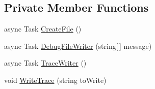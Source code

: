 \subsection*{Private Member Functions}
\begin{DoxyCompactItemize}
\item 
async Task \mbox{\hyperlink{class_little_weeb_library_1_1_handlers_1_1_debug_handler_a913150657a1b7f0b61e4494cc2f3eae1}{Create\+File}} ()
\item 
async Task \mbox{\hyperlink{class_little_weeb_library_1_1_handlers_1_1_debug_handler_a37b616e03da950fb30d1087cb7bc69fd}{Debug\+File\+Writer}} (string\mbox{[}$\,$\mbox{]} message)
\item 
async Task \mbox{\hyperlink{class_little_weeb_library_1_1_handlers_1_1_debug_handler_a733f22d0dabe84bf05463bdaeb2da250}{Trace\+Writer}} ()
\item 
void \mbox{\hyperlink{class_little_weeb_library_1_1_handlers_1_1_debug_handler_ade74885424ad635ba119c8c146bd7e73}{Write\+Trace}} (string to\+Write)
\end{DoxyCompactItemize}
